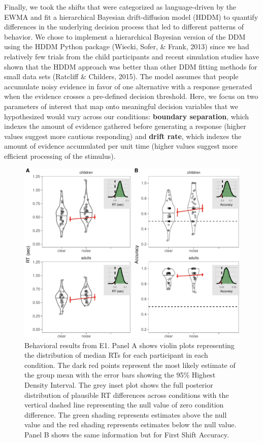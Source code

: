 \documentclass[10pt, letterpaper]{article}
\newenvironment{CodeChunk}{}{}
\begin{document}
Finally, we took the shifts that were categorized as language-driven by
the EWMA and fit a hierarchical Bayesian drift-diffusion model (HDDM) to
quantify differences in the underlying decision process that led to
different patterns of behavior. We chose to implement a hierarchical
Bayesian version of the DDM using the HDDM Python package (Wiecki,
Sofer, \& Frank, 2013) since we had relatively few trials from the child
participants and recent simulation studies have shown that the HDDM
approach was better than other DDM fitting methods for small data sets
(Ratcliff \& Childers, 2015). The model assumes that people accumulate
noisy evidence in favor of one alternative with a response generated
when the evidence crosses a pre-defined decision threshold. Here, we
focus on two parameters of interest that map onto meaningful decision
variables that we hypothesized would vary across our conditions:
\textbf{boundary separation}, which indexes the amount of evidence
gathered before generating a response (higher values suggest more
cautious responding) and \textbf{drift rate}, which indexes the amount
of evidence accumulated per unit time (higher values suggest more
efficient processing of the stimulus).

\begin{CodeChunk}
\begin{figure}[tb]

{\centering \includegraphics[width=0.9\linewidth]{figs/noise_acc_rt_e1_plot-1} 

}

\caption[Behavioral results from E1]{Behavioral results from E1. Panel A shows violin plots representing the distribution of median RTs for each participant in each condition. The dark red points represent the most likely estimate of the group mean with the error bars showing the 95\% Highest Density Interval. The grey inset plot shows the full posterior distribution of plausible RT differences across conditions with the vertical dashed line representing the null value of zero condition difference. The green shading represents estimates above the null value and the red shading represents estimates below the null value. Panel B shows the same information but for First Shift Accuracy.}\label{fig:noise_acc_rt_e1_plot}
\end{figure}
\end{CodeChunk}
\end{document}
